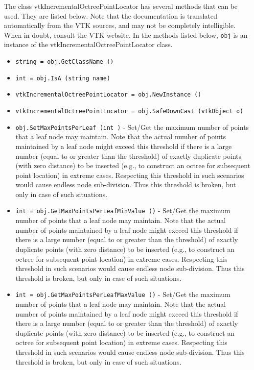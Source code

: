 The class vtkIncrementalOctreePointLocator has several methods that can be used.
  They are listed below.
Note that the documentation is translated automatically from the VTK sources,
and may not be completely intelligible.  When in doubt, consult the VTK website.
In the methods listed below, \verb|obj| is an instance of the vtkIncrementalOctreePointLocator class.
\begin{itemize}
\item  \verb|string = obj.GetClassName ()|

\item  \verb|int = obj.IsA (string name)|

\item  \verb|vtkIncrementalOctreePointLocator = obj.NewInstance ()|

\item  \verb|vtkIncrementalOctreePointLocator = obj.SafeDownCast (vtkObject o)|

\item  \verb|obj.SetMaxPointsPerLeaf (int )| -  Set/Get the maximum number of points that a leaf node may maintain.
 Note that the actual number of points maintained by a leaf node might
 exceed this threshold if there is a large number (equal to or greater
 than the threshold) of exactly duplicate points (with zero distance)
 to be inserted (e.g., to construct an octree for subsequent point 
 location) in extreme cases. Respecting this threshold in such scenarios
 would cause endless node sub-division. Thus this threshold is broken, but
 only in case of such situations.

\item  \verb|int = obj.GetMaxPointsPerLeafMinValue ()| -  Set/Get the maximum number of points that a leaf node may maintain.
 Note that the actual number of points maintained by a leaf node might
 exceed this threshold if there is a large number (equal to or greater
 than the threshold) of exactly duplicate points (with zero distance)
 to be inserted (e.g., to construct an octree for subsequent point 
 location) in extreme cases. Respecting this threshold in such scenarios
 would cause endless node sub-division. Thus this threshold is broken, but
 only in case of such situations.

\item  \verb|int = obj.GetMaxPointsPerLeafMaxValue ()| -  Set/Get the maximum number of points that a leaf node may maintain.
 Note that the actual number of points maintained by a leaf node might
 exceed this threshold if there is a large number (equal to or greater
 than the threshold) of exactly duplicate points (with zero distance)
 to be inserted (e.g., to construct an octree for subsequent point 
 location) in extreme cases. Respecting this threshold in such scenarios
 would cause endless node sub-division. Thus this threshold is broken, but
 only in case of such situations.


\end{itemize}
